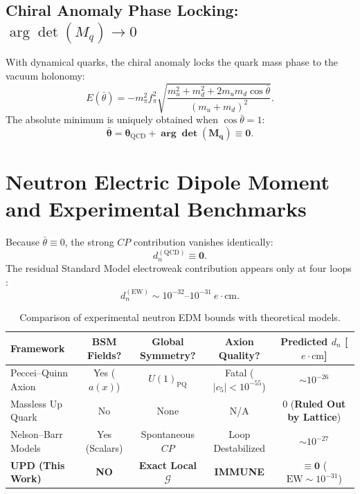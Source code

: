 \documentclass[11pt,a4paper]{article}
\begin{document}
\subsection{Chiral Anomaly Phase Locking: $\arg\det(M_q) \to 0$}
With dynamical quarks, the chiral anomaly locks the quark mass phase to the vacuum holonomy:
\begin{equation}
E(\bar{\theta}) = - m_\pi^2 f_\pi^2 \sqrt{ \frac{m_u^2 + m_d^2 + 2 m_u m_d \cos\bar{\theta}}{(m_u + m_d)^2} }.
\end{equation}
The absolute minimum is uniquely obtained when $\cos\bar{\theta} = 1$:
\begin{equation}
\mathbf{\bar{\theta} = \theta_{\mathrm{QCD}} + \arg\det(M_q) \equiv 0}.
\end{equation}

\section{Neutron Electric Dipole Moment and Experimental Benchmarks}
Because $\bar{\theta} \equiv 0$, the strong $CP$ contribution vanishes identically:
\begin{equation}
d_n^{(\mathrm{QCD})} \equiv \mathbf{0}.
\end{equation}
The residual Standard Model electroweak contribution appears only at four loops \cite{Khriplovich1986}:
\begin{equation}
d_n^{(\mathrm{EW})} \sim 10^{-32}\text{--}10^{-31} \ e \cdot \text{cm}.
\end{equation}

\begin{table}[htbp]
\centering
\caption{Comparison of experimental neutron EDM bounds with theoretical models.}
\vspace{2mm}
\begin{tabular}{lcccc}
\toprule
\textbf{Framework} & \textbf{BSM Fields?} & \textbf{Global Symmetry?} & \textbf{Axion Quality?} & \textbf{Predicted $d_n$ [$e\cdot\text{cm}$]} \\
\midrule
Peccei--Quinn Axion & Yes ($a(x)$) & $U(1)_{\mathrm{PQ}}$ & Fatal ($|c_5| < 10^{-55}$) & $\sim 10^{-26}$ \\
Massless Up Quark & No & None & N/A & $0$ (\textbf{Ruled Out by Lattice}) \\
Nelson--Barr Models & Yes (Scalars) & Spontaneous $CP$ & Loop Destabilized & $\sim 10^{-27}$ \\
\textbf{UPD (This Work)} & \textbf{NO} & \textbf{Exact Local $\mathcal{G}$} & \textbf{IMMUNE} & $\mathbf{\equiv 0}$ ($\mathrm{EW} \sim 10^{-31}$) \\
\bottomrule
\end{tabular}
\end{table}
\end{document}
